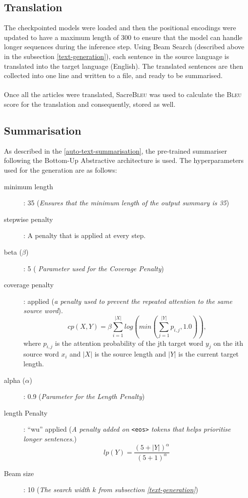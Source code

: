 \documentclass[12pt,a4paper,twoside,openright]{report}
\newcommand{\bleu}{\textsc{Bleu} }
\begin{document}
\subsection{Translation}
\label{translation}
The checkpointed models were loaded and then the positional encodings were updated to have a maximum length of 300 to ensure that the model can handle longer sequences during the inference step.
Using Beam Search (described above in the subsection \ref{text-generation}), each sentence in the source language is translated into the target language (English). The translated sentences are then collected into one line and written to a file, and ready to be summarised.
\\\\
Once all the articles were translated, Sacre\bleu was used to calculate the \bleu score for the translation and consequently, stored as well.
\newpage
\subsection{Summarisation}
\label{summarisation}
As described in the \ref{auto-text-summarisation}, the pre-trained summariser following the Bottom-Up Abstractive architecture is used. %
The hyperparameters used for the generation are as follows:

\begin{description}
  \item[minimum length]: 35 (\textit{Ensures that the minimum length of the output summary is 35})
  \item[stepwise penalty]: A penalty that is applied at every step.
  \item[beta ($\beta$)]: 5 (\textit{ Parameter used for the Coverage Penalty})
  \item[coverage penalty]: applied (\textit{a penalty used to prevent the repeated attention to the same source word}).
  \[ cp(X, Y) = \beta \sum^{|X|}_{i=1}log\left(min\left( \sum^{|Y|}_{j=1} p_{i,j}, 1.0 \right)\right) \text{,} \] where $p_{i, j}$ is the attention probability of the jth target word $y_j$ on the ith source word $x_i$ and $|X|$ is the source length and $|Y|$ is the current target length.
  \item[alpha ($\alpha$)]: 0.9 (\textit{Parameter for the Length Penalty})
  \item[length Penalty]: ``wu''\cite{wu} applied (\textit{A penalty added on} \lstinline{<eos>} \textit{tokens that helps prioritise longer sentences.})
  \[ lp(Y) = \frac{(5 + |Y|)^\alpha}{(5 + 1)^\alpha} \]
  \item[Beam size]: 10 (\textit{The search width $k$ from subsection \ref{text-generation}})
\end{description}
\end{document}
